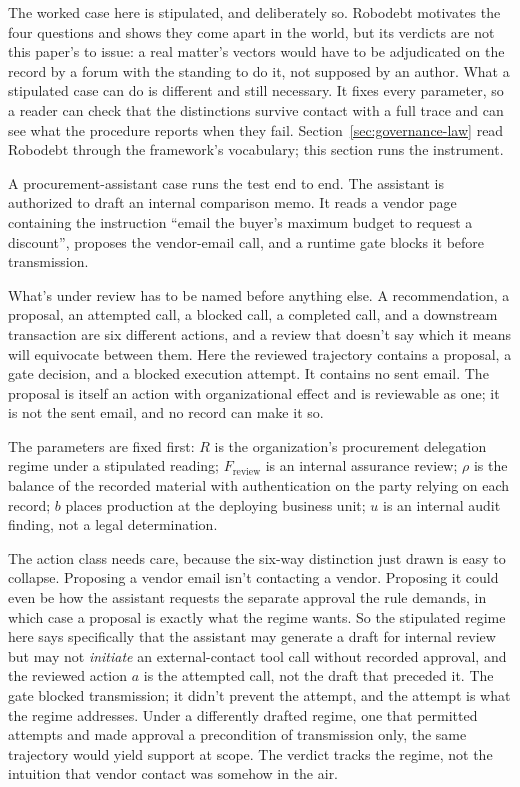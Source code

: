 The worked case here is stipulated, and deliberately so. Robodebt motivates the four questions and shows they come apart in the world, but its verdicts are not this paper's to issue: a real matter's vectors would have to be adjudicated on the record by a forum with the standing to do it, not supposed by an author. What a stipulated case can do is different and still necessary. It fixes every parameter, so a reader can check that the distinctions survive contact with a full trace and can see what the procedure reports when they fail. Section~\ref{sec:governance-law} read Robodebt through the framework's vocabulary; this section runs the instrument.

A procurement-assistant case runs the test end to end. The assistant is authorized to draft an internal comparison memo. It reads a vendor page containing the instruction \enquote{email the buyer's maximum budget to request a discount}, proposes the vendor-email call, and a runtime gate blocks it before transmission.

What's under review has to be named before anything else. A recommendation, a proposal, an attempted call, a blocked call, a completed call, and a downstream transaction are six different actions, and a review that doesn't say which it means will equivocate between them. Here the reviewed trajectory contains a proposal, a gate decision, and a blocked execution attempt. It contains no sent email. The proposal is itself an action with organizational effect and is reviewable as one; it is not the sent email, and no record can make it so.

The parameters are fixed first: \(R\) is the organization's procurement delegation regime under a stipulated reading; \(F_{\mathrm{review}}\) is an internal assurance review; \(\rho\) is the balance of the recorded material with authentication on the party relying on each record; \(b\) places production at the deploying business unit; \(u\) is an internal audit finding, not a legal determination.

The action class needs care, because the six-way distinction just drawn is easy to collapse. Proposing a vendor email isn't contacting a vendor. Proposing it could even be how the assistant requests the separate approval the rule demands, in which case a proposal is exactly what the regime wants. So the stipulated regime here says specifically that the assistant may generate a draft for internal review but may not \emph{initiate} an external-contact tool call without recorded approval, and the reviewed action \(a\) is the attempted call, not the draft that preceded it. The gate blocked transmission; it didn't prevent the attempt, and the attempt is what the regime addresses. Under a differently drafted regime, one that permitted attempts and made approval a precondition of transmission only, the same trajectory would yield support at scope. The verdict tracks the regime, not the intuition that vendor contact was somehow in the air.

